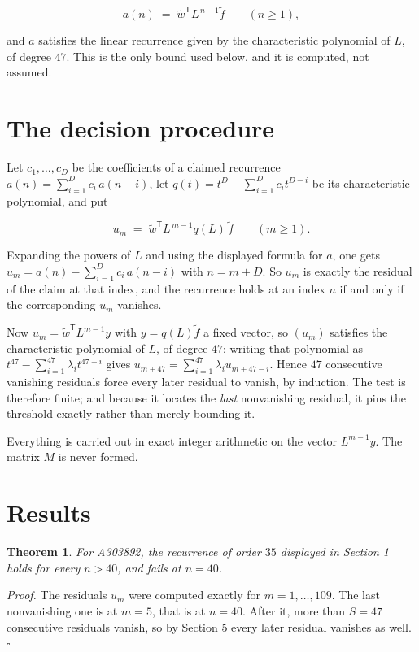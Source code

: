 \documentclass[11pt]{article}
\newtheorem{theorem}{Theorem}
\theoremstyle{definition}
\begin{document}
\[a(n) \;=\; \tilde w^{\mathsf T} L^{\,n-1} \tilde f \qquad (n \ge 1),\]

and $a$ satisfies the linear recurrence given by the characteristic polynomial of $L$, of degree $47$. This is the only bound used below, and it is computed, not assumed.

\section{The decision procedure}

Let $c_1,\dots,c_D$ be the coefficients of a claimed recurrence $a(n) = \sum_{i=1}^{D} c_i\,a(n-i)$, let $q(t) = t^{D} - \sum_{i=1}^{D} c_i t^{D-i}$ be its characteristic polynomial, and put

\[u_m \;=\; \tilde w^{\mathsf T} L^{\,m-1} q(L)\,\tilde f \qquad (m \ge 1).\]

Expanding the powers of $L$ and using the displayed formula for $a$, one gets $u_m = a(n) - \sum_{i=1}^{D} c_i\,a(n-i)$ with $n = m + D$. So $u_m$ is exactly the residual of the claim at that index, and the recurrence holds at an index $n$ if and only if the corresponding $u_m$ vanishes.

Now $u_m = \tilde w^{\mathsf T} L^{m-1} y$ with $y = q(L)\tilde f$ a fixed vector, so $(u_m)$ satisfies the characteristic polynomial of $L$, of degree $47$: writing that polynomial as $t^{47} - \sum_{i=1}^{47} \lambda_i t^{47-i}$ gives $u_{m+47} = \sum_{i=1}^{47} \lambda_i u_{m+47-i}$. Hence $47$ consecutive vanishing residuals force every later residual to vanish, by induction. The test is therefore finite; and because it locates the {\itshape last} nonvanishing residual, it pins the threshold exactly rather than merely bounding it.

Everything is carried out in exact integer arithmetic on the vector $L^{m-1}y$. The matrix $M$ is never formed.

\section{Results}

\begin{theorem} For A303892, the recurrence of order $35$ displayed in Section 1 holds for every $n > 40$, and fails at $n = 40$.\end{theorem}

{\itshape Proof.} The residuals $u_m$ were computed exactly for $m = 1,\dots,109$. The last nonvanishing one is at $m = 5$, that is at $n = 40$. After it, more than $S = 47$ consecutive residuals vanish, so by Section 5 every later residual vanishes as well. $\square$
\end{document}
